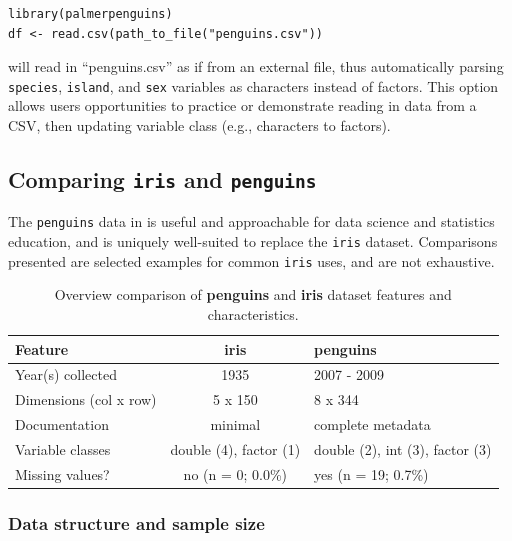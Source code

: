 \begin{verbatim}
library(palmerpenguins)
df <- read.csv(path_to_file("penguins.csv"))
\end{verbatim}

will read in ``penguins.csv'' as if from an external file, thus
automatically parsing \texttt{species}, \texttt{island}, and
\texttt{sex} variables as characters instead of factors. This option
allows users opportunities to practice or demonstrate reading in data
from a CSV, then updating variable class (e.g., characters to factors).

\hypertarget{comparing-iris-and-penguins}{%
\subsection{\texorpdfstring{Comparing \texttt{iris} and
\texttt{penguins}}{Comparing iris and penguins}}\label{comparing-iris-and-penguins}}

The \texttt{penguins} data in  is useful and
approachable for data science and statistics education, and is uniquely
well-suited to replace the \texttt{iris} dataset. Comparisons presented
are selected examples for common \texttt{iris} uses, and are not
exhaustive.

\begin{Schunk}
\begin{table}

\caption{\label{tab:overview-tbl-pdf}Overview comparison of \textbf{penguins} and \textbf{iris} dataset features and characteristics.}
\centering
\begin{tabular}[t]{lcl}
\toprule
Feature & iris & penguins\\
\midrule
Year(s) collected & 1935 & 2007 - 2009\\
Dimensions (col x row) & 5 x 150 & 8 x 344\\
Documentation & minimal & complete metadata\\
Variable classes & double (4), factor (1) & double (2), int (3), factor (3)\\
Missing values? & no (n = 0; 0.0\%) & yes (n = 19; 0.7\%)\\
\bottomrule
\end{tabular}
\end{table}

\end{Schunk}

\hypertarget{data-structure-and-sample-size}{%
\subsubsection{Data structure and sample
size}\label{data-structure-and-sample-size}}

